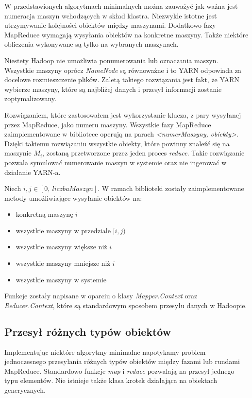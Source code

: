 \documentclass[licencjacka]{pracamgr}
\begin{document}
W przedstawionych algorytmach minimalnych można zauważyć jak ważna jest numeracja maszyn wchodzących w skład klastra. Niezwykle istotne jest utrzymywanie kolejności obiektów między maszynami. Dodatkowo fazy MapReduce wymagają wysyłania obiektów na konkretne maszyny. Także niektóre obliczenia wykonywane są tylko na wybranych maszynach.

Niestety Hadoop nie umożliwia ponumerowania lub oznaczania maszyn. Wszystkie maszyny oprócz \textit{NameNode} są równoważne i to YARN odpowiada za docelowe rozmieszczenie plików. Zaletą takiego rozwiązania jest fakt, że YARN wybierze maszyny, które są najbliżej danych i przesył informacji zostanie zoptymalizowany.

Rozwiązaniem, które zastosowałem jest wykorzystanie klucza, z pary wysyłanej przez MapReduce, jako numeru maszyny. Wszystkie fazy MapReduce zaimplementowane w bibliotece operują na parach \textit{<numerMaszyny, obiekty>}. Dzięki takiemu rozwiązaniu wszystkie obiekty, które powinny znaleźć się na maszynie \(M_i\), zostaną przetworzone przez jeden proces \textit{reduce}. Takie rozwiązanie pozwala symulować numerowanie maszyn w systemie oraz nie ingerować w działanie YARN-a.

Niech \(i, j \in [0, \ liczbaMaszyn]\). W ramach biblioteki zostały zaimplementowane metody umożliwiające wysyłanie obiektów na:
\begin{itemize}
    \item konkretną maszynę \(i\)
    \item wszystkie maszyny w przedziale \([i, j)\)
    \item wszystkie maszyny większe niż \(i\)
    \item wszystkie maszyny mniejsze niż \(i\)
    \item wszystkie maszyny w systemie
\end{itemize}

Funkcje zostały napisane w oparciu o klasy \textit{Mapper.Context} oraz \textit{Reducer.Context}, które są standardowym sposobem przesyłu danych w Hadoopie.

\subsection{Przesył różnych typów obiektów}

Implementując niektóre algorytmy minimalne napotykamy problem jednoczesnego przesyłania różnych typów obiektów między fazami lub rundami MapReduce. Standardowo funkcje \textit{map} i \textit{reduce} pozwalają na przesył jednego typu elementów. Nie istnieje także klasa krotek działająca na obiektach generycznych.
\end{document}
